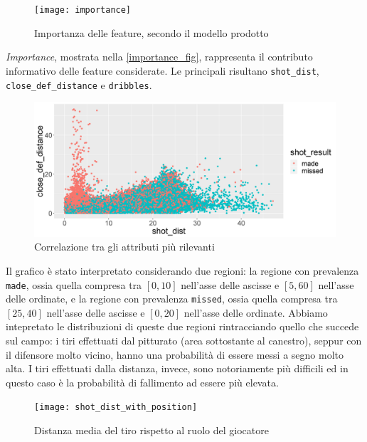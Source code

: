 \par

\begin{figure}
\caption{Importanza delle feature, secondo il modello prodotto}
\label{importance_fig}
\fontsize{9pt}{1em}
	\texttt{[image: importance]}
\end{figure}

\par

\textit{Importance}, mostrata nella \autoref{importance_fig}, rappresenta il contributo informativo delle feature considerate. Le principali risultano \texttt{shot\_dist}, \texttt{close\_def\_distance} e \texttt{dribbles}.

\begin{figure}
\caption{Correlazione tra gli attributi più rilevanti}
\label{plot_shot_dist_def}
\includegraphics[width=\linewidth]{plot_shot_dist_def.png}
\end{figure}

Il grafico è stato interpretato considerando due regioni: la regione con prevalenza \texttt{made}, ossia quella compresa tra $[0, 10]$ nell'asse delle ascisse e $[5, 60] $ nell'asse delle ordinate, e la regione con prevalenza \texttt{missed}, ossia quella compresa tra $[25, 40]$ nell'asse delle ascisse e $[0, 20] $ nell'asse delle ordinate.
Abbiamo intepretato le distribuzioni di queste due regioni rintracciando quello che succede sul campo: i tiri effettuati dal pitturato (area sottostante al canestro), seppur con il difensore molto vicino, hanno una probabilità di essere messi a segno molto alta. I tiri effettuati dalla distanza, invece, sono notoriamente più difficili ed in questo caso è la probabilità di fallimento ad essere più elevata.

\par

\begin{figure}
\caption{Distanza media del tiro rispetto al ruolo del giocatore}
\label{position_shot_dist}
\texttt{[image: shot\_dist\_with\_position]}
\end{figure}

